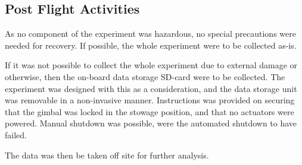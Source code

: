 \subsection{Post Flight Activities}
As no component of the experiment was hazardous, no special precautions were needed for recovery. If possible, the whole experiment were to be collected as-is.

If it was not possible to collect the whole experiment due to external damage or otherwise, then the on-board data storage SD-card were to be collected. The experiment was designed with this as a consideration, and the data storage unit was removable in a non-invasive manner. Instructions was provided on securing that the gimbal was locked in the stowage position, and that no actuators were powered. Manual shutdown was possible, were the automated shutdown to have failed.

The data was then be taken off site for further analysis.


